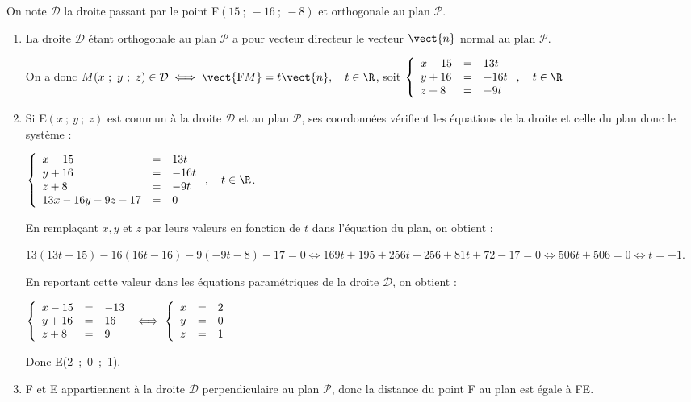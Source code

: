 On note $\mathcal{D}$ la droite passant par le point F$(15~;~-16~;~-8)$ et orthogonale au plan $\mathcal{P}$.
\begin{enumerate}[resume]
\item 
La droite $\mathcal{D}$ étant orthogonale au plan $\mathcal{P}$ a pour vecteur directeur le vecteur $\vect{n}$ normal au plan $\mathcal{P}$.

On a donc $M(x~;~y~;~z) \in \mathcal{D} \iff \vect{\text{F}M} = t \vect{n}, \quad t \in \R$, soit $\left\{\begin{array}{l c l}
x - 15&=&13t\\
y + 16&=&- 16t\\
z + 8&=&- 9t
\end{array}\right., \quad t \in \R$
\item 
Si E$(x~;~y~;~z)$ est commun à la droite $\mathcal{D}$ et au plan $\mathcal{P}$, ses coordonnées vérifient les équations de la droite et celle du plan donc le système :

$\left\{\begin{array}{l c l}
x - 15&=&13t\\
y + 16&=&- 16t\\
z + 8&=&- 9t\\
13x - 16y - 9z - 17 &=& 0
\end{array}\right., \quad t \in \R$.

En remplaçant $x, y$ et $z$ par leurs valeurs en fonction de $t$ dans l'équation du plan, on obtient :

$13(13t + 15) - 16(16t - 16)- 9(- 9t - 8) - 17 = 0 \iff 169t + 195 + 256t + 256 +81t + 72 - 17 = 0 \iff 506t + 506 = 0 \iff t = - 1$.

En reportant cette valeur dans les équations paramétriques de la droite $\mathcal{D}$, on obtient  :

$\left\{\begin{array}{l c l}
x - 15&=&-13 \\
y + 16&=&16\\
z + 8&=&9\\
\end{array}\right.\iff \left\{\begin{array}{l c l}
x &=&2 \\
y &=&0\\
z &=&1\\
\end{array}\right.$

Donc E(2~;~0~;~1).

\item 
F et E appartiennent à la droite $\mathcal{D}$ perpendiculaire au plan $\mathcal{P}$, donc la distance du point F au plan est égale à FE.


\end{enumerate}
